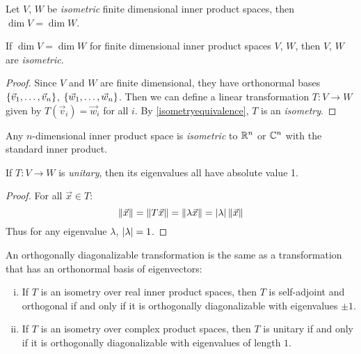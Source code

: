 \begin{corollary}
  Let $V$, $W$ be \emph{isometric} finite dimensional inner product spaces, then $\dim V = \dim W$.
\end{corollary}

\begin{corollary}
  If $\dim V = \dim W$ for finite dimensional inner product spaces $V$, $W$, then $V$, $W$ are \emph{isometric}.
\end{corollary}
\begin{proof}
  Since $V$ and $W$ are finite dimensional, they have orthonormal bases $\left\{\vec v_1, \ldots, \vec v_n\right\}$,
  $\left\{\vec w_1, \ldots, \vec w_n\right\}$. Then we can define a linear transformation $T : V \to W$
  given by $T(\vec v_i) = \vec w_i$ for all $i$.
  By \ref{isometryequivalence}, $T$ is an \emph{isometry}.
\end{proof}

\begin{corollary}
  Any $n$-dimensional inner product space is \emph{isometric} to $\mathbb{R}^n$ or $\mathbb{C}^n$
  with the standard inner product.
\end{corollary}

\begin{corollary}
  If $T : V \to W$ is \emph{unitary}, then its eigenvalues all have absolute value 1.
\end{corollary}
\begin{proof}
  For all $\vec x \in T$:
  $$\left\lVert\vec x\right\rVert = \left\lVert T \vec x\right\rVert = \left\lVert\lambda \vec x\right\rVert = \left|\lambda\right|\left\lVert\vec x\right\rVert$$
  Thus for any eigenvalue $\lambda$, $\left|\lambda\right| = 1$.
\end{proof}

\begin{remark}
  An orthogonally diagonalizable transformation is the same as a transformation that has an orthonormal basis of eigenvectors:
  \begin{enumerate}[i.]
    \item If $T$ is an isometry over real inner product spaces, then $T$ is self-adjoint and orthogonal if and only if
    it is orthogonally diagonalizable with eigenvalues $\pm 1$.
    \item If $T$ is an isometry over complex product spaces, then $T$ is unitary if and only if it is
    orthogonally diagonalizable with eigenvalues of length $1$.
  \end{enumerate}
\end{remark}
